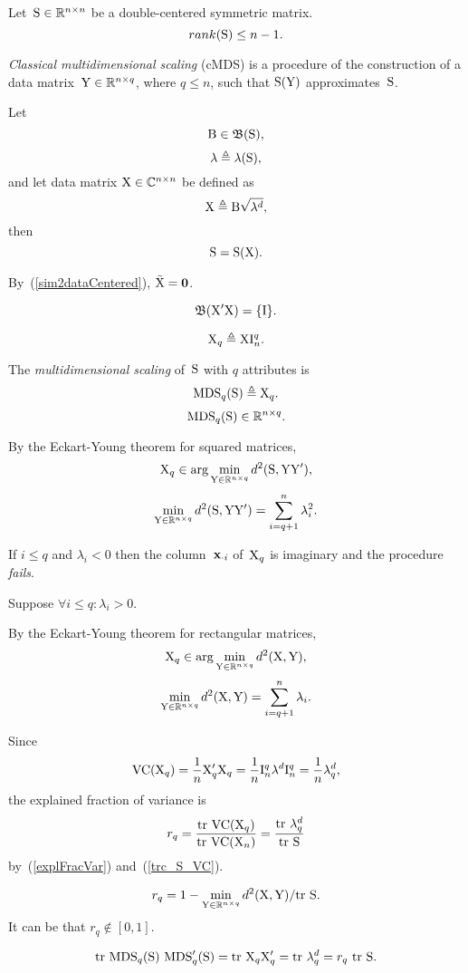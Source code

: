 \documentclass[10pt,a4paper]{article}
\theoremstyle{plain} \newtheorem{Lem}{Lemma}
\begin{document}
Let~$\mathrm S \in \mathbb R^{n \times n}$ be a double-centered symmetric matrix.
$$ rank(\mathrm S) \le n - 1. $$

{\em Classical multidimensional scaling} (cMDS) is a procedure of the construction of a data matrix~$\mathrm Y \in \mathbb R^{n \times q}$, where $q \le n$, 
such that $\mathrm S(\mathrm Y)$ approximates~$\mathrm S$.

Let
$$ \mathrm B \in \mathfrak B (\mathrm S), $$
$$ \mathbf \lambda \triangleq \lambda(\mathrm S), $$
and let data matrix $\mathrm X \in \mathbb C^{n \times n}$ be defined as
$$ \mathrm X \triangleq \mathrm B \sqrt{\mathbf \lambda^d}, $$
then 
$$ \mathrm S = \mathrm S(\mathrm X). $$

By~(\ref{sim2dataCentered}), $\bar {\mathrm X} = \mathbf 0$.

$$ \mathfrak B (\mathrm X' \mathrm X) = \{\mathrm I\}. $$

$$ \mathrm X_q \triangleq \mathrm X \mathrm I^q_n. $$

The {\em multidimensional scaling} of~$\mathrm S$ with $q$ attributes is
$$ \mathrm {MDS}_q(\mathrm S) \triangleq \mathrm X_q. $$
$$ \mathrm {MDS}_q(\mathrm S) \in \mathbb R^{n \times q}. $$

By the Eckart-Young theorem for squared matrices,
$$ \mathrm X_q \in \arg \min_{\mathrm Y \in \mathbb R^{n \times q}} d^2(\mathrm S, \mathrm Y \mathrm Y'), $$
$$ \min_{\mathrm Y \in \mathbb R^{n \times q}} d^2(\mathrm S, \mathrm Y \mathrm Y') = \sum_{i = q+1}^n \lambda_i^2. $$

If $i \le q$ and $\lambda_i < 0$ then the column~$\mathbf x_{\cdot i}$ of~$\mathrm X_q$ is imaginary and the procedure {\em fails}.

Suppose $\forall i \le q : \lambda_i > 0$.

By the Eckart-Young theorem for rectangular matrices,
$$ \mathrm X_q \in \arg \min_{\mathrm Y \in \mathbb R^{n \times q}} d^2(\mathrm X, \mathrm Y), $$
$$ \min_{\mathrm Y \in \mathbb R^{n \times q}} d^2(\mathrm X, \mathrm Y) = \sum_{i = q+1}^n \lambda_i. $$

Since
$$ \mathrm {VC} (\mathrm X_q)  = \frac 1 n \mathrm X_q' \mathrm X_q = \frac 1 n \mathrm I^q_n \mathbf \lambda^d \mathrm I^q_n = \frac 1 n \mathbf \lambda_q^d, $$
the explained fraction of variance is
$$ r_q = \frac {\mathrm {tr} \  \mathrm {VC} (\mathrm X_q)} {\mathrm {tr} \  \mathrm {VC} (\mathrm X_n)} = \frac {\mathrm {tr} \  \mathbf \lambda^d_q} {\mathrm {tr} \  \mathrm S} $$
by~(\ref{explFracVar}) and~(\ref{trc_S_VC}). 

$$ r_q = 1 - \min_{\mathrm Y \in \mathbb R^{n \times q}} d^2(\mathrm X, \mathrm Y) / \mathrm {tr} \  \mathrm S. $$
It can be that $r_q \not \in [0,1]$.

$$ \mathrm {tr} \  \mathrm {MDS}_q(\mathrm S) \ \mathrm {MDS}_q'(\mathrm S) = \mathrm {tr} \  \mathrm X_q \mathrm X_q' = \mathrm {tr} \  \mathbf \lambda^d_q = r_q \ \mathrm {tr} \  \mathrm S. $$
\end{document}
